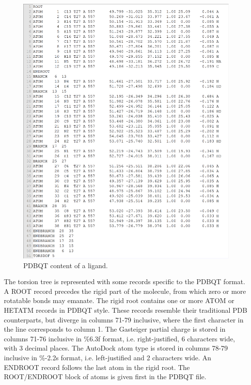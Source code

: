 \begin{figure}
\centering
\includegraphics[width=\linewidth]{../usrt/T27CrystalPDBQT.png}
\caption{PDBQT content of a ligand.}
\label{idock:PDBQT}
\end{figure}

The torsion tree is represented with some records specific to the PDBQT format. A ROOT record precedes the rigid part of the molecule, from which zero or more rotatable bonds may emanate. The rigid root contains one or more ATOM or HETATM records in PDBQT style. These records resemble their traditional PDB counterparts, but diverge in columns 71-79 inclusive, where the first character in the line corresponds to column 1. The Gasteiger partial charge is stored in columns 71-76 inclusive in \%6.3f format, i.e. right-justified, 6 characters wide, with 3 decimal places. The AutoDock atom type is stored in columns 78-79 inclusive in \%-2.2s format, i.e. left-justified and 2 characters wide. An ENDROOT record follows the last atom in the rigid root. The ROOT/ENDROOT block of atoms is given first in the PDBQT file.


